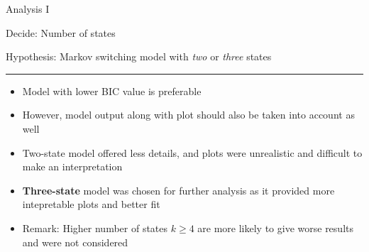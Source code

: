 \documentclass{beamer}
\begin{document}
\begin{frame}

Analysis I

Decide: Number of states

Hypothesis: Markov switching model with \textit{two} or \textit{three} states
\rule{\textwidth}{0.4pt}

\begin{itemize}
	\item Model with lower BIC value is preferable
	\item However, model output along with plot should also be taken into account as well
	\pause
	\item Two-state model offered less details, and plots were unrealistic and difficult to make an interpretation
	\item \textbf{Three-state} model was chosen for further analysis as it provided more intepretable plots and better fit
	\item \small{Remark: Higher number of states $k\geq4$ are more likely to give worse results and were not considered}
\end{itemize}

\end{frame}
\end{document}
